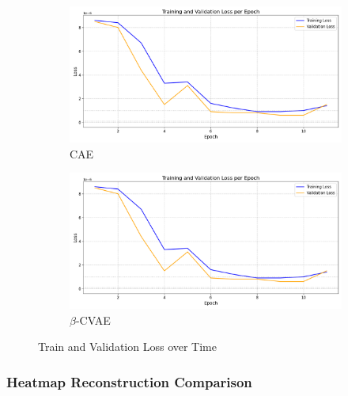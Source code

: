 \begin{figure}[!h]
  \begin{subfigure}[t]{.6\textwidth}
    \centering
    \includegraphics[width=\linewidth]{figures/losses/ae.png}
    \caption{CAE}
  \end{subfigure}
  \hfill
  \begin{subfigure}[t]{.6\textwidth}
    \centering
    \includegraphics[width=\linewidth]{figures/losses/ae.png}
    \caption{$\beta$-CVAE}
  \end{subfigure}
  \label{fig:losses}
  \caption{Train and Validation Loss over Time}
\end{figure}

\clearpage

\subsubsection{Heatmap Reconstruction Comparison}

